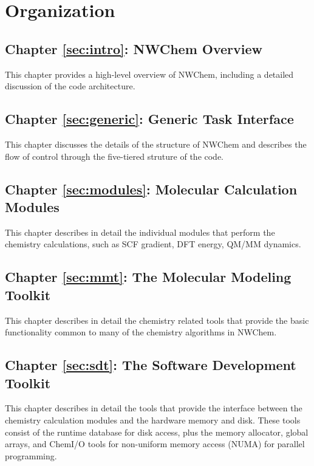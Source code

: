 \section*{Organization}

\subsection*{Chapter \ref{sec:intro}: NWChem Overview}

This chapter provides a high-level overview of NWChem, including a detailed
discussion of the code architecture.  

\subsection*{Chapter \ref{sec:generic}: Generic Task Interface}

This chapter discusses the details of the structure of NWChem
and describes the flow of control through the five-tiered struture
of the code.

\subsection*{Chapter \ref{sec:modules}:  Molecular Calculation Modules}

This chapter describes in detail the individual modules that perform the chemistry
calculations, such as SCF gradient, DFT energy, QM/MM dynamics.

\subsection*{Chapter \ref{sec:mmt}: The Molecular Modeling Toolkit}

This chapter describes in detail the chemistry related tools that provide the basic 
functionality common to many of the chemistry algorithms in NWChem.

\subsection*{Chapter \ref{sec:sdt}: The Software Development Toolkit}

This chapter describes in detail the tools that provide the interface between
the chemistry calculation modules and the hardware memory and disk.  These tools 
consist of the runtime database for disk access, plus the memory allocator, 
global arrays, and ChemI/O tools
for  non-uniform memory access (NUMA) for parallel programming.

